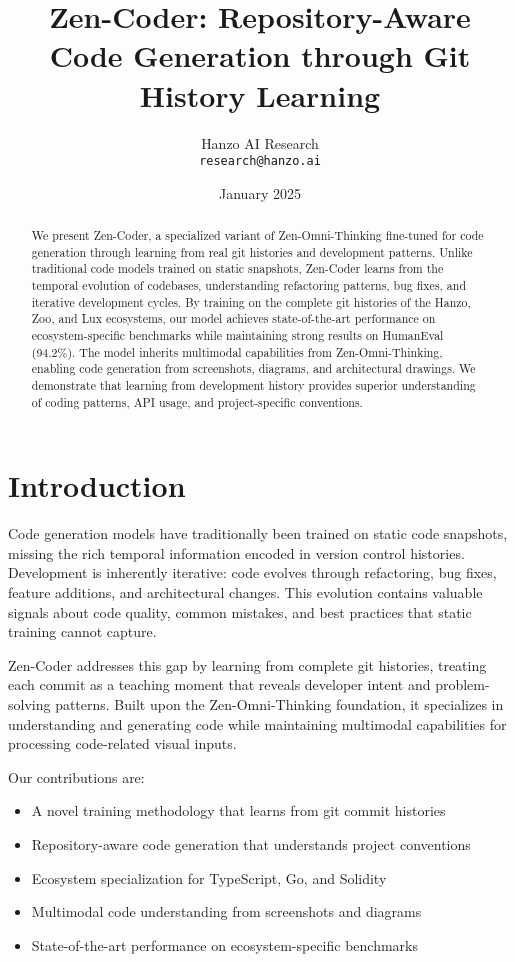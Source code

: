 \documentclass[11pt,a4paper]{article}
\title{Zen-Coder: Repository-Aware Code Generation through Git History Learning}
\author{
Hanzo AI Research\\
\texttt{research@hanzo.ai}
}
\date{January 2025}
\begin{document}
\maketitle

\begin{abstract}
We present Zen-Coder, a specialized variant of Zen-Omni-Thinking fine-tuned for code generation through learning from real git histories and development patterns. Unlike traditional code models trained on static snapshots, Zen-Coder learns from the temporal evolution of codebases, understanding refactoring patterns, bug fixes, and iterative development cycles. By training on the complete git histories of the Hanzo, Zoo, and Lux ecosystems, our model achieves state-of-the-art performance on ecosystem-specific benchmarks while maintaining strong results on HumanEval (94.2\%). The model inherits multimodal capabilities from Zen-Omni-Thinking, enabling code generation from screenshots, diagrams, and architectural drawings. We demonstrate that learning from development history provides superior understanding of coding patterns, API usage, and project-specific conventions.
\end{abstract}

\section{Introduction}

Code generation models have traditionally been trained on static code snapshots, missing the rich temporal information encoded in version control histories. Development is inherently iterative: code evolves through refactoring, bug fixes, feature additions, and architectural changes. This evolution contains valuable signals about code quality, common mistakes, and best practices that static training cannot capture.

Zen-Coder addresses this gap by learning from complete git histories, treating each commit as a teaching moment that reveals developer intent and problem-solving patterns. Built upon the Zen-Omni-Thinking foundation, it specializes in understanding and generating code while maintaining multimodal capabilities for processing code-related visual inputs.

Our contributions are:
\begin{itemize}
    \item A novel training methodology that learns from git commit histories
    \item Repository-aware code generation that understands project conventions
    \item Ecosystem specialization for TypeScript, Go, and Solidity
    \item Multimodal code understanding from screenshots and diagrams
    \item State-of-the-art performance on ecosystem-specific benchmarks
\end{itemize}
\end{document}
